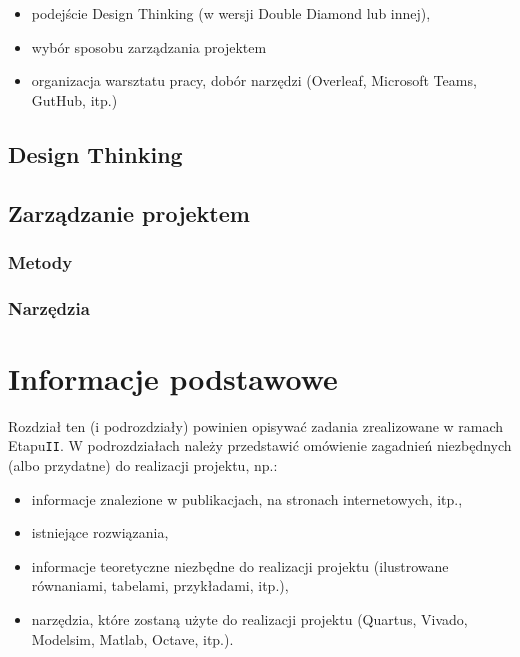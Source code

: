 \documentclass[a4paper,titleauthor]{mwart}
\begin{document}
\begin{itemize}
	\item podejście Design Thinking (w wersji Double Diamond lub innej),
	\item wybór sposobu zarządzania projektem
	\item organizacja warsztatu pracy, dobór narzędzi (Overleaf, Microsoft Teams, GutHub, itp.)
\end{itemize}

\subsection{Design Thinking}
\label{sec:design_thinking}

\subsection{Zarządzanie projektem}
\label{sec:zarządzanie_projektem}

\subsubsection{Metody}
\label{sec:narzędzia}

\subsubsection{Narzędzia}
\label{sec:narzędzia}

\section{Informacje podstawowe}
\label{sec:informacje_podstawowe}

Rozdział ten (i podrozdziały) powinien opisywać zadania zrealizowane w ramach Etapu\texttt{II}. W podrozdziałach należy przedstawić omówienie zagadnień niezbędnych (albo przydatne) do realizacji projektu, np.:

\begin{itemize}
	\item informacje znalezione w publikacjach, na stronach internetowych, itp.,
	\item istniejące rozwiązania,
	\item informacje teoretyczne niezbędne do realizacji projektu (ilustrowane równaniami, tabelami, przykładami, itp.),
	\item narzędzia, które zostaną użyte do realizacji projektu (Quartus, Vivado, Modelsim, Matlab, Octave, itp.).
\end{itemize}
\end{document}
